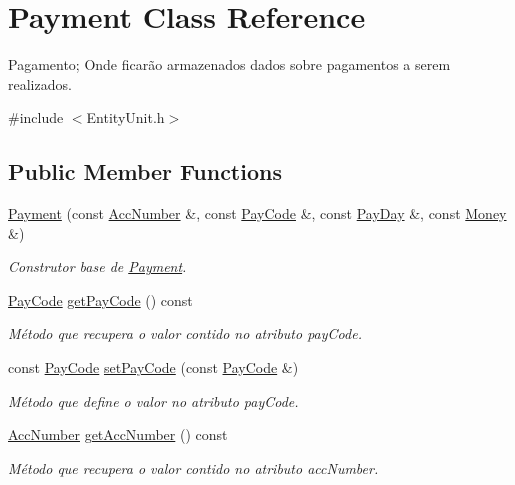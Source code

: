 \hypertarget{classPayment}{\section{Payment Class Reference}
\label{d5/d5e/classPayment}
}


Pagamento; Onde ficarão armazenados dados sobre pagamentos a serem realizados.  




{\ttfamily \#include $<$Entity\-Unit.\-h$>$}

\subsection*{Public Member Functions}
\begin{DoxyCompactItemize}
\item 
\hyperlink{classPayment_a685b1fb1a327aff7a1f456b5232a1947}{Payment} (const \hyperlink{classAccNumber}{Acc\-Number} \&, const \hyperlink{classPayCode}{Pay\-Code} \&, const \hyperlink{classPayDay}{Pay\-Day} \&, const \hyperlink{classMoney}{Money} \&)
\begin{DoxyCompactList}\small\item\em Construtor base de \hyperlink{classPayment}{Payment}. \end{DoxyCompactList}\item 
\hyperlink{classPayCode}{Pay\-Code} \hyperlink{classPayment_a1d71998fa33e757bb350eb40895865ae}{get\-Pay\-Code} () const 
\begin{DoxyCompactList}\small\item\em Método que recupera o valor contido no atributo pay\-Code. \end{DoxyCompactList}\item 
const \hyperlink{classPayCode}{Pay\-Code} \hyperlink{classPayment_adf458db6331e53948a473a04a0d622a4}{set\-Pay\-Code} (const \hyperlink{classPayCode}{Pay\-Code} \&)
\begin{DoxyCompactList}\small\item\em Método que define o valor no atributo pay\-Code. \end{DoxyCompactList}\item 
\hyperlink{classAccNumber}{Acc\-Number} \hyperlink{classPayment_a66c51330aef2e045884e25618a194904}{get\-Acc\-Number} () const 
\begin{DoxyCompactList}\small\item\em Método que recupera o valor contido no atributo acc\-Number. \end{DoxyCompactList}\item 

\end{DoxyCompactItemize}

